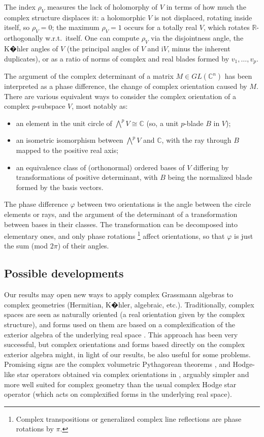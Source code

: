\documentclass{birkjour}
\theoremstyle{definition}
\def\R			{\mathds{R}}
\def\C			{\mathds{C}}
\def\wrt					{w.r.t.\ }
\def\im	 					{\mathrm{i}}				%
\begin{document}
The index $\rho_V$ measures the lack of holomorphy of $V$ in terms of how much the complex structure displaces it: a holomorphic $V$ is not displaced, rotating inside itself, so $\rho_V = 0$; the maximum $\rho_V = 1$ occurs for a totally real $V$, which rotates $\R$-orthogonally \wrt itself.
One can compute $\rho_V$ via the disjointness angle, the K�hler angles of $V$ (the principal angles of $V$ and $\im V$, minus the inherent duplicates), or as a ratio of norms of complex and real blades formed by $v_1,\ldots,v_p$.

The argument of the complex determinant of a matrix $M \in GL(\C^n)$ has been interpreted as a phase difference, the change of complex orientation caused by $M$.
There are various equivalent ways to consider the complex orientation of a complex $p$-subspace $V$, most notably as:
\begin{itemize}
	\item an element in the unit circle of $\bigwedge^p V \cong \C$ (so, a unit $p$-blade $B$ in $V$);
	
	\item an isometric isomorphism between $\bigwedge^p V$ and $\C$, with the ray through $B$ mapped to the positive real axis;
	
	\item an equivalence class of (orthonormal) ordered bases of $V$ differing by transformations of positive determinant, with $B$ being the normalized blade formed by the basis vectors.
\end{itemize} 
The phase difference $\varphi$ between two orientations is the angle between the circle elements or rays,
and the argument of the determinant of a transformation between bases in their classes.
The transformation can be decomposed into elementary ones, and only phase rotations%
\footnote{Complex transpositions or generalized complex line reflections are phase rotations by $\pi$.}
affect orientations, 
so that $\varphi$ is just the sum (mod $2\pi$) of their angles.


\subsection{Possible developments}


Our results may open new ways to apply complex Grassmann algebras to complex geometries (Hermitian, K�hler, algebraic, etc.).
Traditionally, complex spaces are seen as naturally oriented (a real orientation given by the complex structure), and forms used on them are based on a complexification of the exterior algebra of the underlying real space \cite{Goldman1999,Griffiths1994}.
This approach has been very successful, but complex orientations and forms based directly on the complex exterior algebra might, in light of our results, be also useful for some problems. 
Promising signs are the complex volumetric Pythagorean theorems \cite{Mandolesi_Pythagorean}, 
and Hodge-like star operators obtained via complex orientations in \cite{Mandolesi_Contractions}, arguably simpler and more well suited for complex geometry than the usual complex Hodge star operator (which acts on complexified forms in the underlying real space).
\end{document}
